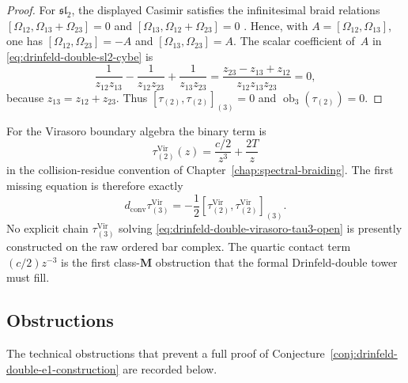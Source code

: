 \begin{proof}
For $\mathfrak{sl}_2$, the displayed Casimir satisfies the infinitesimal
braid relations
$[\Omega_{12},\Omega_{13}+\Omega_{23}]=0$ and
$[\Omega_{13},\Omega_{12}+\Omega_{23}]=0$
\cite{Kohno1987}. Hence, with
$A=[\Omega_{12},\Omega_{13}]$, one has
$[\Omega_{12},\Omega_{23}]=-A$ and
$[\Omega_{13},\Omega_{23}]=A$. The scalar coefficient of~$A$ in
\eqref{eq:drinfeld-double-sl2-cybe} is
\[
 \frac{1}{z_{12}z_{13}}
 -\frac{1}{z_{12}z_{23}}
 +\frac{1}{z_{13}z_{23}}
 =
 \frac{z_{23}-z_{13}+z_{12}}
 {z_{12}z_{13}z_{23}}
 =0,
\]
because $z_{13}=z_{12}+z_{23}$. Thus
$[\tau_{(2)},\tau_{(2)}]_{(3)}=0$ and
$\operatorname{ob}_3(\tau_{(2)})=0$.
\end{proof}

\begin{remark}
\label{rem:drinfeld-double-virasoro-tau3-gap}
%
For the Virasoro boundary algebra the binary term is
\[
 \tau_{(2)}^{\mathrm{Vir}}(z)
 =
 \frac{c/2}{z^3}+\frac{2T}{z}
\]
in the collision-residue convention of
Chapter~\ref{chap:spectral-braiding}. The first missing equation is
therefore exactly
\begin{equation}\label{eq:drinfeld-double-virasoro-tau3-open}
 d_{\mathrm{conv}}\tau_{(3)}^{\mathrm{Vir}}
 =
 -\frac12
 [\tau_{(2)}^{\mathrm{Vir}},\tau_{(2)}^{\mathrm{Vir}}]_{(3)} .
\end{equation}
No explicit chain $\tau_{(3)}^{\mathrm{Vir}}$ solving
\eqref{eq:drinfeld-double-virasoro-tau3-open} is presently constructed
on the raw ordered bar complex. The quartic contact term
$(c/2)z^{-3}$ is the first class-$\mathbf M$ obstruction that the
formal Drinfeld-double tower must fill.
\end{remark}

\subsection{Obstructions}
\label{subsec:drinfeld-e1-obstructions}

The technical obstructions that prevent a full
proof of Conjecture~\ref{conj:drinfeld-double-e1-construction} are recorded below.

